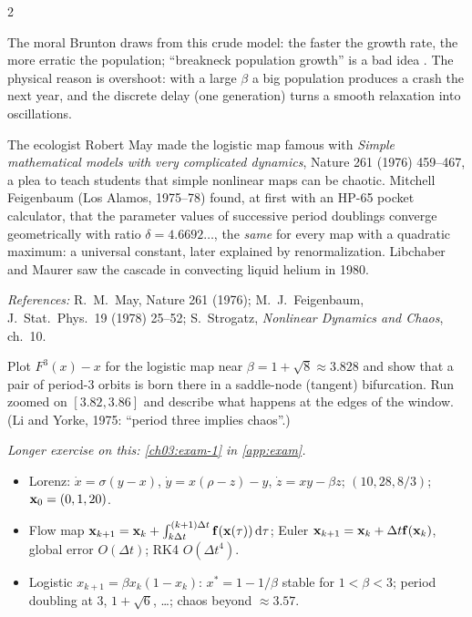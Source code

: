 \begin{paracol}{2}
\begin{intuition}
The moral Brunton draws from this crude model: the faster the growth rate, the more erratic the
population; ``breakneck population growth'' is a bad idea . The physical
reason is overshoot: with a large $\beta$ a big population produces a crash the next year, and the
discrete delay (one generation) turns a smooth relaxation into oscillations.
\end{intuition}

\begin{history}
The ecologist Robert May made the logistic map famous with \emph{Simple mathematical models with very
complicated dynamics}, Nature 261 (1976) 459--467, a plea to teach students that simple nonlinear maps
can be chaotic. Mitchell Feigenbaum (Los Alamos, 1975--78) found, at first with an HP-65 pocket
calculator, that the parameter values of successive period doublings converge geometrically with ratio
$\delta=4.6692\ldots$, the \emph{same} for every map with a quadratic maximum: a universal constant,
later explained by renormalization. Libchaber and Maurer saw the cascade in convecting liquid helium in
1980.\par
\textit{References:} R.~M.~May, Nature 261 (1976); M.~J.~Feigenbaum, J.\ Stat.\ Phys.\ 19 (1978) 25--52;
S.~Strogatz, \emph{Nonlinear Dynamics and Chaos}, ch.~10.
\end{history}

\begin{exercise}
Plot $F^3(x)-x$ for the logistic map near $\beta=1+\sqrt8\approx3.828$ and show that a pair of period-3
orbits is born there in a saddle-node (tangent) bifurcation. Run  zoomed on
$[3.82,3.86]$ and describe what happens at the edges of the window. (Li and Yorke, 1975: ``period
three implies chaos''.)
\end{exercise}

\noindent\emph{Longer exercise on this: \cref{ch03:exam-1} in \cref{app:exam}.}

\begin{keyformulas}
\begin{itemize}
  \item Lorenz: $\dot x=\sigma(y-x)$, $\dot y=x(\rho-z)-y$, $\dot z=xy-\beta z$; $(10,28,8/3)$; $\mathbf{x}_0=(0,1,20)$.
  \item Flow map $\mathbf{x}_{k+1}=\mathbf{x}_k+\int_{k\Delta t}^{(k+1)\Delta t}\mathbf{f}(\mathbf{x}(\tau))\,\mathrm{d}\tau$; Euler
        $\mathbf{x}_{k+1}=\mathbf{x}_k+\Delta t\mathbf{f}(\mathbf{x}_k)$, global error $O(\Delta t)$; RK4 $O(\Delta t^4)$.
  \item Logistic $x_{k+1}=\beta x_k(1-x_k)$: $x^*=1-1/\beta$ stable for $1<\beta<3$; period doubling at
        $3$, $1+\sqrt6$, \dots; chaos beyond $\approx3.57$.
\end{itemize}
\end{keyformulas}

\end{paracol}
